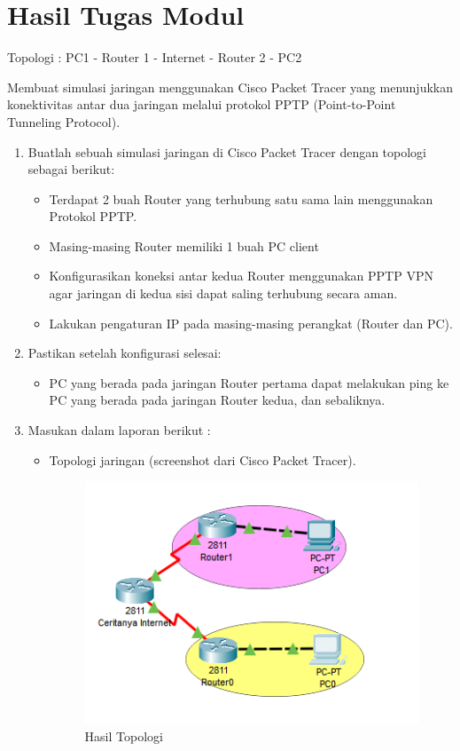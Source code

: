 \section{Hasil Tugas Modul}
Topologi : PC1 - Router 1 - Internet - Router 2 - PC2

Membuat simulasi jaringan menggunakan Cisco Packet Tracer yang menunjukkan konektivitas antar dua jaringan melalui protokol PPTP (Point-to-Point Tunneling Protocol).

\begin{enumerate}
  \item Buatlah sebuah simulasi jaringan di Cisco Packet Tracer dengan topologi sebagai berikut:
  \begin{itemize}
    \item Terdapat 2 buah Router yang terhubung satu sama lain menggunakan Protokol PPTP.
    \item Masing-masing Router memiliki 1 buah PC client
    \item Konfigurasikan koneksi antar kedua Router menggunakan PPTP VPN agar jaringan di kedua sisi dapat saling terhubung secara aman.
    \item Lakukan pengaturan IP pada masing-masing perangkat (Router dan PC).
  \end{itemize}

  \item Pastikan setelah konfigurasi selesai:
  \begin{itemize}
    \item PC yang berada pada jaringan Router pertama dapat melakukan ping ke PC yang berada pada jaringan Router kedua, dan sebaliknya.
  \end{itemize}

  \item Masukan dalam laporan berikut :
  \begin{itemize}
    \item Topologi jaringan (screenshot dari Cisco Packet Tracer).
\begin{figure}[h]
  \centering
  \includegraphics[width=0.5\linewidth]{tumod/tumod topologi p5.png}
  \caption{Hasil Topologi}
  \label{fig:topologi tumod}
\end{figure}


\end{itemize}
\end{enumerate}
